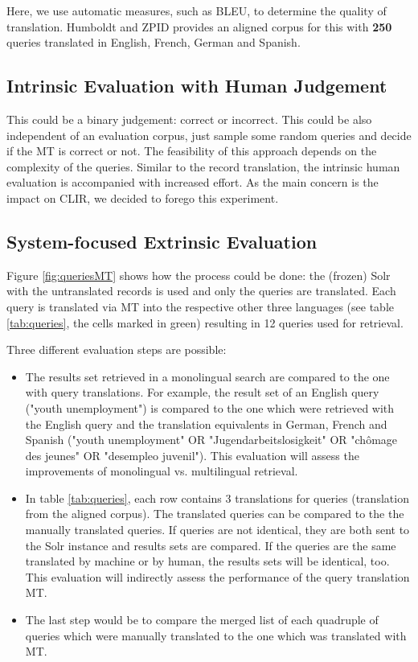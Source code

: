 \documentclass[a4paper,11pt]{article}
\begin{document}
Here, we use automatic measures, such as BLEU, to determine the quality of translation. Humboldt and ZPID provides an aligned corpus for this with \textbf{250} queries translated in  English, French, German and Spanish. 

\subsection{Intrinsic Evaluation with Human Judgement}
This could be a binary judgement: correct or incorrect.
This could be also independent of an evaluation corpus, just sample some random queries and decide if the MT is correct or not. The feasibility of this approach depends on the complexity of the queries. Similar to the record translation, the intrinsic human evaluation is accompanied with increased effort. As the main concern is the impact on CLIR, we decided to forego this experiment. 

\subsection{System-focused Extrinsic Evaluation}
Figure \ref{fig:queriesMT} shows how the process could be done: the (frozen) Solr with the untranslated records is used and only the queries are translated. Each query is translated via MT into the respective other three languages (see table \ref{tab:queries}, the cells marked in green) resulting in 12 queries used for retrieval.

Three different evaluation steps are possible: 
\begin{itemize}
\item The results set retrieved in a monolingual search are compared to the one with query translations. For example, the result set of an English query ("youth unemployment") is compared to the one which were retrieved with the English query and the translation equivalents in German, French and Spanish ("youth unemployment" OR "Jugendarbeitslosigkeit" OR "chômage des jeunes" OR "desempleo juvenil"). This evaluation will assess the improvements of monolingual vs. multilingual  retrieval.
\item In table \ref{tab:queries}, each row contains 3 translations for queries (translation from the aligned corpus). The translated queries can be compared to the the manually translated queries. If queries are not identical, they are both sent to the Solr instance and results sets are compared. If the queries are the same translated by machine or by human, the results sets will be identical, too. This evaluation will indirectly assess the performance of the query translation MT. 
\item The last step would be to compare the merged list of each quadruple of queries which were manually translated to the one which was translated with MT.
\end{itemize}
 
\end{document}
